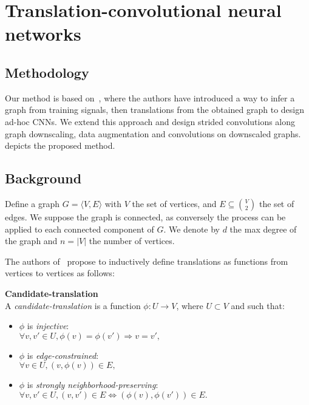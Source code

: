 \section{Translation-convolutional neural networks}

\subsection{Methodology}

Our method is based on~\cite{pasdeloup2017convolutional}, where the authors have introduced a way to infer a graph from training signals, then translations from the obtained graph to design ad-hoc CNNs. We extend this approach and design strided convolutions along graph downscaling, data augmentation and convolutions on downscaled graphs.  depicts the proposed method.



\subsection{Background}

Define a graph $G = \langle V, E \rangle$ with $V$ the set of vertices, and $E \subseteq\binom{V}{2}$ the set of edges. We suppose the graph is connected, as conversely the process can be applied to each connected component of $G$. We denote by $d$ the max degree of the graph and $n = |V|$ the number of vertices.

The authors of~\cite{pasdeloup2017convolutional} propose to inductively define translations as functions from vertices to vertices as follows:

\begin{definition}{\textbf{Candidate-translation}}\\
  A \emph{candidate-translation} is a function $\phi: U \to V$, where $U \subset V$ and such that:
  \begin{itemize}[noitemsep,nolistsep]
  \item $\phi$ is \emph{injective}:\\
  $\forall v,v' \in U, \phi(v) = \phi(v') \Rightarrow v = v',$
  \item $\phi$ is \emph{edge-constrained}:\\
  $\forall v \in U, (v,\phi(v)) \in E,$
  \item $\phi$ is \emph{strongly neighborhood-preserving}:\\
  $\forall v,v' \in U, (v,v')\in E \Leftrightarrow (\phi(v),\phi(v')) \in E.$\\
  \end{itemize}
\end{definition}

